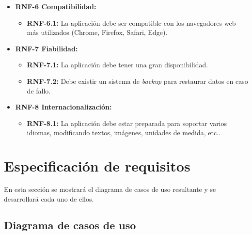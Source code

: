 \begin{itemize}[label=\textbullet]
    \item \textbf{RNF-6 Compatibilidad:}
    \begin{itemize}[label=--]
        \item \textbf{RNF-6.1:} La aplicación debe ser compatible con los navegadores web más utilizados (Chrome, Firefox, Safari, Edge).
    \end{itemize}
    \item \textbf{RNF-7 Fiabilidad:}
    \begin{itemize}[label=--]
        \item \textbf{RNF-7.1:} La aplicación debe tener una gran disponibilidad.
        \item \textbf{RNF-7.2:} Debe existir un sistema de \textit{backup} para restaurar datos en caso de fallo.
    \end{itemize}
    \item \textbf{RNF-8 Internacionalización:}
    \begin{itemize}[label=--]
        \item \textbf{RNF-8.1:} La aplicación debe estar preparada para soportar varios idiomas, modificando textos, imágenes, unidades de medida, etc..
    \end{itemize}
\end{itemize}
\section{Especificación de requisitos}
En esta sección se mostrará el diagrama de casos de uso resultante y se desarrollará cada uno de ellos.

\subsection{Diagrama de casos de uso}

